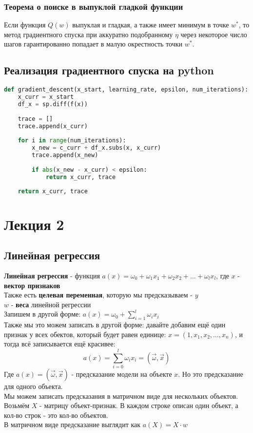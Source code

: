 \documentclass{article}
\theoremstyle{problemstyle}
\theoremstyle{ans}
\begin{document}
\subsubsection{Теорема о поиске в выпуклой гладкой функции}
Если функция $Q(w)$ выпуклая и гладкая, а также имеет минимум в точке $w^*$, то метод градиентного спуска при аккуратно подобранному $\eta$ через некоторое число шагов гарантированно попадает в малую окрестность точки $w^*$.

\subsection{Реализация градиентного спуска на python}
\begin{lstlisting}[language=python]
def gradient_descent(x_start, learning_rate, epsilon, num_iterations):
    x_curr = x_start
    df_x = sp.diff(f(x))
    
    trace = []
    trace.append(x_curr)
    
    for i in range(num_iterations):
        x_new = c_curr + df_x.subs(x, x_curr)
        trace.append(x_new)
        
        if abs(x_new - x_curr) < epsilon:
            return x_curr, trace
            
    return x_curr, trace
\end{lstlisting}
\newpage

\section{Лекция 2}
\subsection{Линейная регрессия}
\textbf{Линейная регрессия} - функция $a(x) = \omega_0 + \omega_1 x_1 + \omega_2 x_2 + \dots + \omega_l x_l$, где $x$ - \textbf{вектор признаков}\\
Также есть \textbf{целевая переменная}, которую мы предсказываем - $y$\\
$w$ - \textbf{веса} линейной регрессии\\
Запишем в другой форме: $a(x) = \omega_0 + \sum\limits_{i=1}^{l} \omega_i x_i$\\
Также мы это можем записать в другой форме: давайте добавим ещё один признак у всех обектов, который будет равен единице: $x = (1, x_1, x_2, \dots, x_n)$, и тогда всё записывается ещё красивее:
$$a(x) = \sum\limits_{i=0}^{l} \omega_i x_i = (\overrightarrow{\omega}, \overrightarrow{x})$$
Где $a(x) = (\overrightarrow{\omega}, \overrightarrow{x})$ - предсказание модели на объекте $x$. Но это предсказание для одного объекта.\\
Мы можем записать предсказания в матричном виде для нескольких объектов. Возьмём $X$ - матрицу объект-признак. В каждом строке описан один объект, а кол-во строк - это кол-во объектов.\\
В матричном виде предсказание выглядит как $a(X) = X \cdot w$
\end{document}
